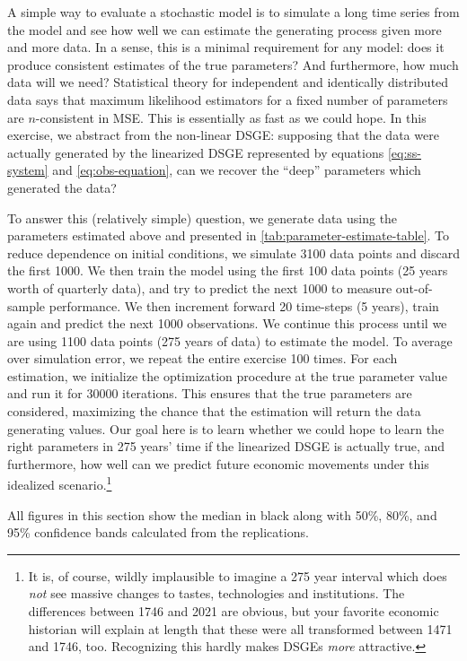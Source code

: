 \documentclass[11pt]{article}
\begin{document}
A simple way to evaluate a stochastic model is to simulate a long time
series from the model and see how well we can estimate the generating
process given more and more data. In a sense, this is a minimal
requirement for any model: does it produce consistent estimates of the
true parameters? And furthermore, how much data will we need?
Statistical theory for independent and identically distributed data says
that maximum likelihood estimators for a fixed number of parameters are
\(n\)-consistent in MSE. This is essentially as fast as we could hope.
In this exercise, we abstract from the non-linear DSGE: supposing that
the data were actually generated by the linearized DSGE represented by
equations \eqref{eq:ss-system} and \eqref{eq:obs-equation}, can we
recover the ``deep'' parameters which generated the data?

To answer this (relatively simple) question, we generate data using the
parameters estimated above and presented in
\autoref{tab:parameter-estimate-table}. To reduce dependence on initial
conditions, we simulate 3100 data points and discard the first 1000. We
then train the model using the first 100 data points (25 years worth of
quarterly data), and try to predict the next 1000 to measure
out-of-sample performance. We then increment forward 20 time-steps (5
years), train again and predict the next 1000 observations. We continue
this process until we are using 1100 data points (275 years of data) to
estimate the model. To average over simulation error, we repeat the
entire exercise 100 times. For each estimation, we initialize the
optimization procedure at the true parameter value and run it for 30000
iterations. This ensures that the true parameters are considered,
maximizing the chance that the estimation will return the data
generating values. Our goal here is to learn whether we could hope to
learn the right parameters in 275 years' time if the linearized DSGE is
actually true, and furthermore, how well can we predict future economic
movements under this idealized scenario.\footnote{It is, of course,
  wildly implausible to imagine a 275 year interval which does
  \emph{not} see massive changes to tastes, technologies and
  institutions. The differences between 1746 and 2021 are obvious, but
  your favorite economic historian will explain at length that these
  were all transformed between 1471 and 1746, too. Recognizing this
  hardly makes DSGEs \emph{more} attractive.}

All figures in this section show the median in black along with 50\%,
80\%, and 95\% confidence bands calculated from the replications.
\end{document}
